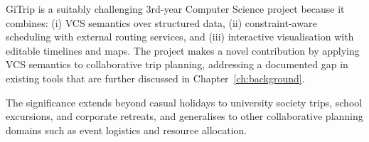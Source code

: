 GiTrip is a suitably challenging 3rd-year Computer Science project because it combines: (i) VCS semantics over structured data, (ii) constraint-aware scheduling with external routing services, and (iii) interactive visualisation with editable timelines and maps. The project makes a novel contribution by applying VCS semantics to collaborative trip planning, addressing a documented gap in existing tools that are further discussed in Chapter~\ref{ch:background}.

The significance extends beyond casual holidays to university society trips, school excursions, and corporate retreats, and generalises to other collaborative planning domains such as event logistics and resource allocation.